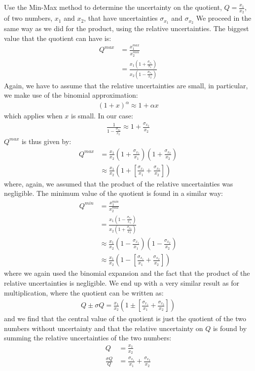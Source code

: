 \begin{example}{}{Use the Min-Max method to determine the uncertainty on the quotient, $Q=\frac{x_1}{x_2}$, of two numbers, $x_1$ and $x_2$, that have uncertainties $\sigma_{x_1}$ and $\sigma_{x_2}$}{}
We proceed in the same way as we did for the product, using the relative uncertainties. The biggest value that the quotient can have is:
\begin{align*}
Q^{max}&=\frac{x_1^{max}}{x_2^{min}}\nonumber\\
  &=\frac{x_1\left(1+\frac{\sigma_{x_1}}{x_1}\right)}{x_2\left(1-\frac{\sigma_{x_2}}{x_2}\right)}
\end{align*}
Again, we have to assume that the relative uncertainties are small, in particular, we make use of the binomial approximation:
\begin{align*}
(1+x)^\alpha\approx 1+\alpha x
\end{align*}
which applies when $x$ is small. In our case:
\begin{align*}
\frac{1}{1-\frac{\sigma_{x_2}}{x_2}}\approx 1+\frac{\sigma_{x_2}}{x_2}
\end{align*}
$Q^{max}$ is thus given by:
\begin{align*}
Q^{max}&=\frac{x_1}{x_2}\left(1+\frac{\sigma_{x_1}}{x_1}\right)\left(1+\frac{\sigma_{x_2}}{x_2}\right)\\
  &\approx \frac{x_1}{x_2}\left(1+\left[\frac{\sigma_{x_1}}{x_1}+\frac{\sigma_{x_2}}{x_2}\right]\right)
\end{align*}
where, again, we assumed that the product of the relative uncertainties was negligible. The minimum value of the quotient is found in a similar way:
\begin{align*}
Q^{min}&=\frac{x_1^{min}}{x_2^{max}}\nonumber\\
  &=\frac{x_1\left(1-\frac{\sigma_{x_1}}{x_1}\right)}{x_2\left(1+\frac{\sigma_{x_2}}{x_2}\right)}\\
  &\approx\frac{x_1}{x_2}\left(1-\frac{\sigma_{x_1}}{x_1}\right)\left(1-\frac{\sigma_{x_2}}{x_2}\right)\\
  &\approx \frac{x_1}{x_2}\left(1-\left[\frac{\sigma_{x_1}}{x_1}+\frac{\sigma_{x_2}}{x_2}\right]\right)
\end{align*}
where we again used the binomial expansion and the fact that the product of the relative uncertainties is negligible. We end up with a very similar result as for multiplication, where the quotient can be written as:
\begin{align*}
Q \pm \sigma Q = \frac{x_1}{x_2}\left(1\pm\left[\frac{\sigma_{x_1}}{x_1}+\frac{\sigma_{x_2}}{x_2}\right]\right)
\end{align*}
and we find that the central value of the quotient is just the quotient of the two numbers without uncertainty and that the relative uncertainty on $Q$ is found by summing the relative uncertainties of the two numbers:
\begin{align*}
Q&=\frac{x_1}{x_2}\\
\frac{\sigma Q}{Q} &= \frac{\sigma_{x_1}}{x_1}+\frac{\sigma_{x_2}}{x_2}
\end{align*}
\end{example}
